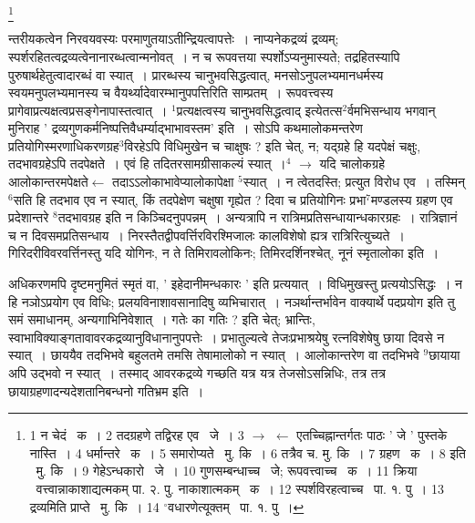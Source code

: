 \documentclass[11pt, openany]{book}
\newcommand\blfootnote[1]{%
 \begingroup
 \renewcommand\thefootnote{}\footnote{#1}%
 \addtocounter{footnote}{-1}%
 \endgroup
}
\begin{document}
\blfootnote{1 न चेदं  \textendash\ क~। 2 तदग्रहणे तद्विरह एव  \textendash\ जे~। 3 $\rightarrow$ $\leftarrow$ एतच्चिह्नान्तर्गतः पाठः ' जे ' पुस्तके नास्ति~। 4 धर्मान्तरे \textendash\ क~। 5 समारोप्यते  \textendash\ मु. कि~। 6 तत्रैव च. मु. कि~। 7 ग्रहण  \textendash\ क~। 8 इति  \textendash\ मु. कि~। 9 गेहेऽन्धकारो  \textendash\ जे~। 10 गुणसम्बन्धाच्च  \textendash\ जे; रूपवत्त्वाच्च  \textendash\ क~। 11 क्रिया  \textendash\ वत्त्वान्नाकाशाद्यत्मकम् पा. २. पु. नाकाशात्मकम्  \textendash\ क~। 12 स्पर्शविरहत्वाच्च  \textendash\ पा. १. पु~। 13 द्रव्यमिति प्राप्ते  \textendash\ मु. कि~। 14 ${}^\circ$वधारणेत्यूक्तम्  \textendash\ पा. १. पु~।}

\newpage
\noindent
न्तरीयकत्वेन निरवयवस्यः परमाणुतयाऽतीन्द्रियत्वापत्तेः~। नाप्यनेकद्रव्यं द्रव्यम्; स्पर्शरहितत्वद्रव्यत्वेनानारब्धत्वान्मनोवत्~। न च रूपवत्तया स्पर्शोऽप्यनुमास्यते; तद्रहितस्यापि पुरुषार्थहेतुत्वादारब्धं वा स्यात्~। प्रारब्धस्य चानुभवसिद्धत्वात्, मनसोऽनुपलभ्यमानधर्मस्य स्वयमनुपलभ्यमानस्य च वैयर्थ्यादेवारम्भानुपपत्तिरिति साम्प्रतम्~। रूपवत्त्वस्य प्रागेवाप्रत्यक्षत्वप्रसङ्गेनापास्तत्वात्~। ${}^1$प्रत्यक्षत्वस्य चानुभवसिद्धत्वाद् इत्येतत्स$^2$र्वमभिसन्धाय भगवान् मुनिराह ' द्रव्यगुणकर्मनिष्पत्तिवैधर्म्याद्भाभावस्तम' इति~। सोऽपि कथमालोकमन्तरेण प्रतियोगिस्मरणाधिकरणग्रह$^3$विरहेऽपि विधिमुखेन च चाक्षुषः ? इति चेत्, न; यद्ग्रहे हि यदपेक्षं चक्षुः, तदभावग्रहेऽपि तदपेक्षते~। एवं हि तदितरसामग्रीसाकल्यं स्यात्~।$^4$ $\rightarrow$ यदि चालोकग्रहे आलोकान्तरमपेक्षते$\leftarrow$ तदाऽऽलोकाभावेप्यालोकापेक्षा ${}^5$स्यात्~। न त्वेतदस्ति; प्रत्युत विरोध एव~। तस्मिन् ${}^6$सति हि तदभाव एव न स्यात्, किं तदपेक्षेण चक्षुषा गृह्येत ? दिवा च प्रतियोगिनः प्रभा$^7$मण्डलस्य ग्रहण एव प्रदेशान्तरे ${}^8$तदभावग्रह इति न किञ्चिदनुपपन्नम्~। अन्यत्रापि न रात्रिमप्रतिसन्धायान्धकारग्रहः~। रात्रिज्ञानं च न दिवसमप्रतिसन्धाय~। निरस्तैतद्वीपवर्त्तिरविरश्मिजालः कालविशेषो ह्यत्र रात्रिरित्युच्यते~। गिरिदरीविवरवर्त्तिनस्तु यदि योगिनः, न ते तिमिरावलोकिनः; तिमिरदर्शिनश्चेत्, नूनं स्मृतालोका इति~।

अधिकरणमपि दृष्टमनुमितं स्मृतं वा, ' इहेदानीमन्धकारः ' इति प्रत्ययात्~। विधिमुखस्तु प्रत्ययोऽसिद्धः~। न हि नञोऽप्रयोग एव विधिः; प्रलयविनाशावसानादिषु व्यभिचारात्~। नञर्थान्तर्भावेन वाक्यार्थे पदप्रयोग इति तु समं समाधानम्, अन्यगाभिनिवेशात्~। गतेः का गतिः ? इति चेत्; भ्रान्तिः, स्वाभाविक्याङ्गतावावरकद्रव्यानुविधानानुपपत्तेः~। प्रभातुल्यत्वे तेजःप्रभाश्रयेषु रत्नविशेषेषु छाया दिवसे न स्यात्~। छाययैव तदभिभवे बहुलतमे तमसि तेषामालोको न स्यात्~। आलोकान्तरेण वा तदभिभवे ${}^9$छायाया अपि उद्भवो न स्यात्~। तस्माद् आवरकद्रव्ये गच्छति यत्र यत्र तेजसोऽसन्निधिः, तत्र तत्र छायाग्रहणादन्यदेशतानिबन्धनो गतिभ्रम इति~।
\end{document}
